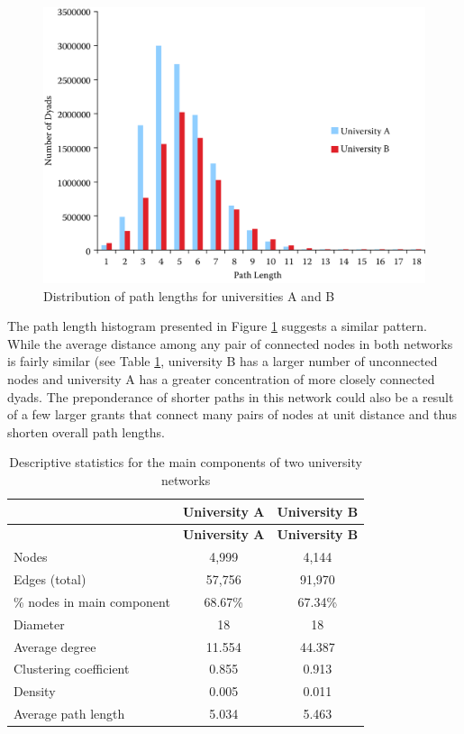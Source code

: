 \documentclass[]{krantz}
\begin{document}
\begin{figure}

{\centering \includegraphics[width=0.7\linewidth]{ChapterNetworks/figures/fig8-8} 

}

\caption{Distribution of path lengths for universities A and B}\label{fig:fig8-8}
\end{figure}

The path length histogram presented in Figure \ref{fig:fig8-8} suggests
a similar pattern. While the average distance among any pair of
connected nodes in both networks is fairly similar (see Table
\ref{tab:table8-1}, university B has a larger number of unconnected
nodes and university A has a greater concentration of more closely
connected dyads. The preponderance of shorter paths in this network
could also be a result of a few larger grants that connect many pairs of
nodes at unit distance and thus shorten overall path lengths.

\begin{longtable}[]{@{}lcc@{}}
\caption{\label{tab:table8-1} Descriptive statistics for the main components
of two university networks}\tabularnewline
\toprule
& \textbf{University A} & \textbf{University B}\tabularnewline
\midrule
\endfirsthead
\toprule
& \textbf{University A} & \textbf{University B}\tabularnewline
\midrule
\endhead
Nodes & 4,999 & 4,144\tabularnewline
Edges (total) & 57,756 & 91,970\tabularnewline
\% nodes in main component & 68.67\% & 67.34\%\tabularnewline
Diameter & 18 & 18\tabularnewline
Average degree & 11.554 & 44.387\tabularnewline
Clustering coefficient & 0.855 & 0.913\tabularnewline
Density & 0.005 & 0.011\tabularnewline
Average path length & 5.034 & 5.463\tabularnewline
\bottomrule
\end{longtable}
\end{document}

